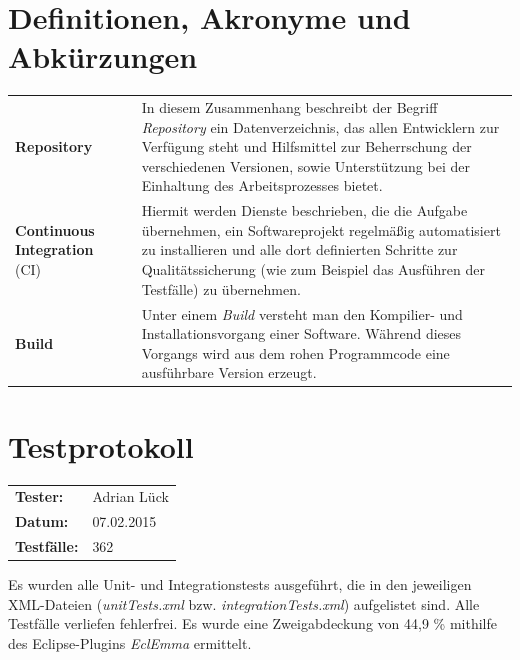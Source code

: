 \documentclass[fontsize=12pt,paper=a4,twoside]{scrartcl}
\renewcommand{\arraystretch}{1.2}
\begin{document}

\newpage

  \thispagestyle{fancy}
  \fancyhead{}
  \fancyfoot{}
  \renewcommand{\headrulewidth}{0.4pt}

\section{Definitionen, Akronyme und Abkürzungen}
\renewcommand{\arraystretch}{2}
\begin{tabularx}{\textwidth}{Xp{1cm}p{9.5cm}}
\textbf{Repository} & & In diesem Zusammenhang beschreibt der Begriff \textit{Repository} ein Datenverzeichnis, das allen Entwicklern zur Verfügung steht und Hilfsmittel zur Beherrschung der verschiedenen Versionen, sowie Unterstützung bei der Einhaltung des Arbeitsprozesses bietet.\\
\textbf{Continuous Integration} (CI) & & Hiermit werden Dienste beschrieben, die die Aufgabe übernehmen, ein Softwareprojekt regelmäßig automatisiert zu installieren und alle dort definierten Schritte zur Qualitätssicherung (wie zum Beispiel das Ausführen der Testfälle) zu übernehmen. \\
\textbf{Build} & & Unter einem \textit{Build} versteht man den Kompilier- und Installationsvorgang einer Software. Während dieses Vorgangs wird aus dem rohen Programmcode eine ausführbare Version erzeugt. \\
\end{tabularx}

\section{Testprotokoll}

\begin{tabular}{ll}
\textbf{Tester:} & Adrian Lück\\
\textbf{Datum:} & 07.02.2015\\
\textbf{Testfälle:} & 362 
\end{tabular}

Es wurden alle Unit- und Integrationstests ausgeführt, die in den jeweiligen XML-Dateien (\textit{unitTests.xml} bzw. \textit{integrationTests.xml}) aufgelistet sind. Alle Testfälle verliefen fehlerfrei. Es wurde eine Zweigabdeckung von 44,9 \% mithilfe des Eclipse-Plugins \textit{EclEmma} ermittelt.\\
\end{document}
